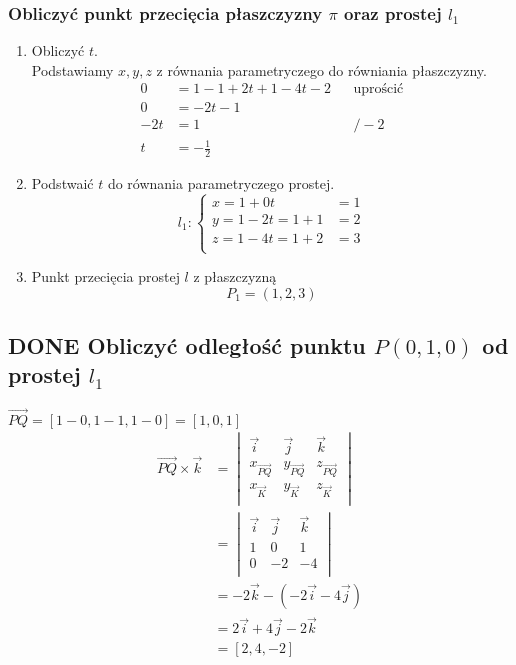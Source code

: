 \documentclass[11pt]{article}
\begin{document}
\subsubsection{Obliczyć punkt przecięcia płaszczyzny \(\pi\) oraz prostej \(l_1\)}
\label{sec:org56ecfc0}
\begin{enumerate}
\item Obliczyć \(t\).
\label{sec:org09301bb}
\\\empty
Podstawiamy \(x, y, z\) z równania parametryczego do równiania płaszczyzny.
\begin{align*}
  0 &= 1 - 1 + 2t + 1 - 4t -2 && \text{uprościć}
  \\
  0 &= -2t -1
  \\
  -2t &= 1 && / -2
  \\
  t &= - \frac{1}{2}
\end{align*}
\item Podstwaić \(t\) do równania parametryczego prostej.
\label{sec:orgadf91df}
\[l_1 : \begin{cases}
        x = 1 + 0t &= 1\\
        y = 1 - 2t = 1 + 1 &= 2 \\
        z = 1 - 4t = 1 + 2 &= 3\\
\end{cases}\]
\item Punkt przecięcia prostej \(l\) z płaszczyzną
\label{sec:orgfcbd88d}
\[P_1 = (1, 2, 3)\]
\end{enumerate}
\subsection{{\bfseries\sffamily DONE} Obliczyć odległość punktu \(P(0,1,0)\) od prostej \(l_1\)}
\label{sec:orgec35fe4}
\(\overrightarrow{PQ} = [1 -0 ,1 - 1,1  -0] = [ 1, 0, 1]\)
\begin{align*}
  \overrightarrow{PQ} \times \overrightarrow{k}
  &= \begin{vmatrix}
       \vec i & \vec j & \vec k\\
       x_{\overrightarrow{PQ}} & y_{\overrightarrow{PQ}} & z_{\overrightarrow{PQ}}\\
       x_{\vec{K}} & y_{\vec{K}} & z_{\vec{K}}\\
     \end{vmatrix}
  \\
  &= \begin{vmatrix}
       \vec i & \vec j & \vec k\\
       1 & 0 & 1\\
       0 & -2 & -4\\
     \end{vmatrix}
  \\
  &= -2 \vec k - (-2 \vec i -4 \vec j)
  \\
  &= 2 \vec i + 4 \vec j - 2 \vec k
  \\
  &= [2, 4, -2]
\end{align*}
\end{document}
